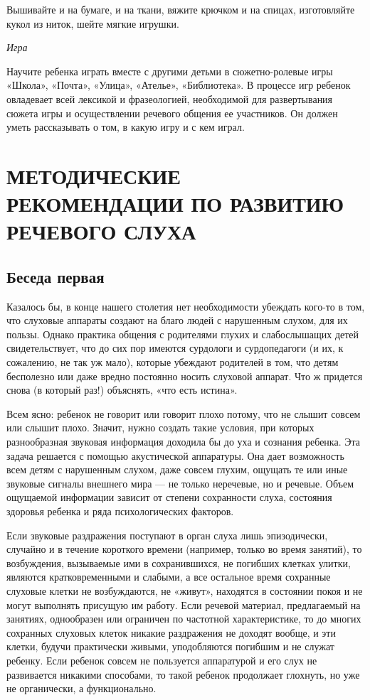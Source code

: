\documentclass[a5paper]{book}
\renewcommand{\emph}[1]{\textit{#1}}
\begin{document}
Вышивайте и на бумаге, и на ткани, вяжите крючком и на спицах,
изготовляйте кукол из ниток, шейте мягкие игрушки.

\emph{Игра}

Научите ребенка играть вместе с другими детьми в сюжетно-ролевые игры
«Школа», «Почта», «Улица», «Ателье», «Библиотека». В процессе игр
ребенок овладевает всей лексикой и фразеологией, необходимой для
развертывания сюжета игры и осуществлении речевого общения ее
участников. Он должен уметь рассказывать о том, в какую игру и с кем
играл.

\section{МЕТОДИЧЕСКИЕ РЕКОМЕНДАЦИИ ПО РАЗВИТИЮ РЕЧЕВОГО СЛУХА}

\subsection*{Беседа первая}

Казалось бы, в конце нашего столетия нет необходимости убеждать кого-то
в том, что слуховые аппараты создают на благо людей с нарушенным слухом,
для их пользы. Однако практика общения с родителями глухих и
слабослышащих детей свидетельствует, что до сих пор имеются сурдологи и
сурдопедагоги (и их, к сожалению, не так уж мало), которые убеждают
родителей в том, что детям бесполезно или даже вредно постоянно носить
слуховой аппарат. Что ж придется снова (в который раз!) объяснять, «что
есть истина».

Всем ясно: ребенок не говорит или говорит плохо потому, что не слышит
совсем или слышит плохо. Значит, нужно создать такие условия, при
которых разнообразная звуковая информация доходила бы до уха и сознания
ребенка. Эта задача решается с помощью акустической аппаратуры. Она дает
возможность всем детям с нарушенным слухом, даже совсем глухим, ощущать
те или иные звуковые сигналы внешнего мира --- не только неречевые, но и
речевые. Объем ощущаемой информации зависит от степени сохранности
слуха, состояния здоровья ребенка и ряда психологических факторов.

Если звуковые раздражения поступают в орган слуха лишь эпизодически,
случайно и в течение короткого времени (например, только во время
занятий), то возбуждения, вызываемые ими в сохранившихся, не погибших
клетках улитки, являются кратковременными и слабыми, а все остальное
время сохранные слуховые клетки не возбуждаются, не «живут», находятся в
состоянии покоя и не могут выполнять присущую им работу. Если речевой
материал, предлагаемый на занятиях, однообразен или ограничен по
частотной характеристике, то до многих сохранных слуховых клеток никакие
раздражения не доходят вообще, и эти клетки, будучи практически живыми,
уподобляются погибшим и не служат ребенку. Если ребенок совсем не
пользуется аппаратурой и его слух не развивается никакими способами, то
такой ребенок продолжает глохнуть, но уже не органически, а
функционально.
\end{document}
